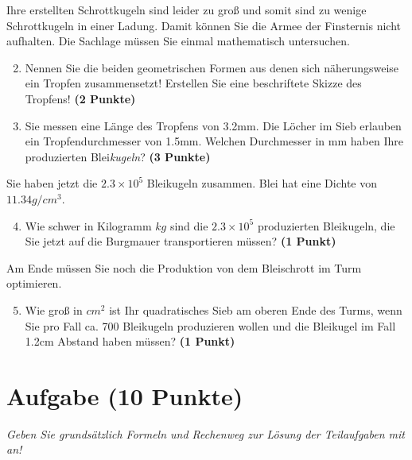 \documentclass[a4paper, 9pt]{scrartcl}\usepackage[]{graphicx}\usepackage[]{xcolor}
\begin{document}
Ihre erstellten Schrottkugeln sind leider zu gro{\ss} und somit sind zu wenige
Schrottkugeln in einer Ladung. Damit k{\"o}nnen Sie die Armee der Finsternis
nicht aufhalten. Die Sachlage m{\"u}ssen Sie einmal mathematisch untersuchen.

\begin{enumerate}
  \setcounter{enumi}{1}
\item Nennen Sie die beiden geometrischen Formen aus denen sich
  n{\"a}herungsweise ein Tropfen zusammensetzt! Erstellen Sie eine beschriftete 
  Skizze des Tropfens!
  \textbf{(2 Punkte)}
\item Sie messen eine L{\"a}nge des Tropfens von 3.2mm. Die L{\"o}cher
  im Sieb erlauben ein Tropfendurchmesser von 1.5mm. Welchen
  Durchmesser in mm haben Ihre produzierten Blei\textit{kugeln}?  \textbf{(3 Punkte)}
\end{enumerate}

Sie haben jetzt die \ensuremath{2.3\times 10^{5}} Bleikugeln zusammen. Blei hat eine Dichte
von $11.34g/cm^3$.

\begin{enumerate}
  \setcounter{enumi}{3}
\item Wie schwer in Kilogramm $kg$ sind die \ensuremath{2.3\times 10^{5}} produzierten
  Bleikugeln, die Sie jetzt auf die Burgmauer transportieren m{\"u}ssen?
  \textbf{(1 Punkt)}
\end{enumerate}

Am Ende m{\"u}ssen Sie noch die Produktion von dem Bleischrott im Turm optimieren.

\begin{enumerate}
  \setcounter{enumi}{4}
\item Wie gro{\ss} in $cm^2$ ist Ihr quadratisches Sieb am oberen Ende des Turms,
  wenn Sie pro Fall ca. 700 Bleikugeln produzieren wollen und
  die Bleikugel im Fall 1.2cm Abstand haben m{\"u}ssen?  \textbf{(1
    Punkt)}
\end{enumerate}
 
\clearpage

\section{Aufgabe \hfill (10 Punkte)}

\textit{Geben Sie grunds{\"a}tzlich Formeln und Rechenweg zur L{\"o}sung der
  Teilaufgaben mit an!} \\[1Ex]
\end{document}
